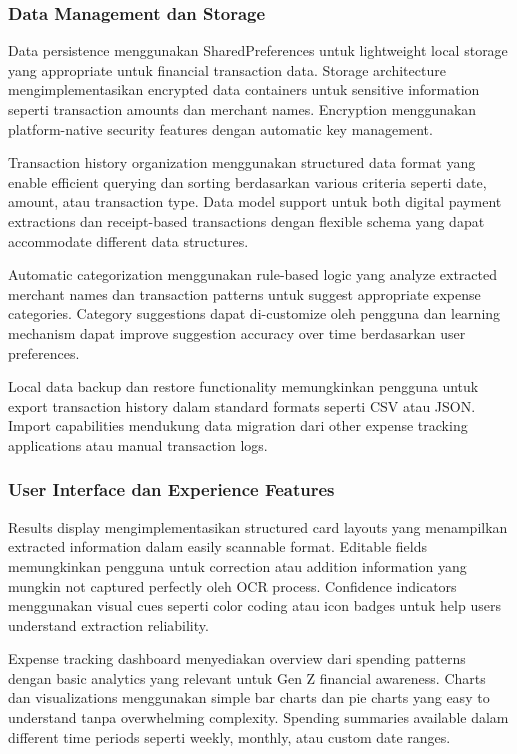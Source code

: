\subsubsection{Data Management dan Storage}
\label{subsubsec:data-management}

Data persistence menggunakan SharedPreferences untuk lightweight local storage yang appropriate untuk financial transaction data. Storage architecture mengimplementasikan encrypted data containers untuk sensitive information seperti transaction amounts dan merchant names. Encryption menggunakan platform-native security features dengan automatic key management.

Transaction history organization menggunakan structured data format yang enable efficient querying dan sorting berdasarkan various criteria seperti date, amount, atau transaction type. Data model support untuk both digital payment extractions dan receipt-based transactions dengan flexible schema yang dapat accommodate different data structures.

Automatic categorization menggunakan rule-based logic yang analyze extracted merchant names dan transaction patterns untuk suggest appropriate expense categories. Category suggestions dapat di-customize oleh pengguna dan learning mechanism dapat improve suggestion accuracy over time berdasarkan user preferences.

Local data backup dan restore functionality memungkinkan pengguna untuk export transaction history dalam standard formats seperti CSV atau JSON. Import capabilities mendukung data migration dari other expense tracking applications atau manual transaction logs.

\subsubsection{User Interface dan Experience Features}
\label{subsubsec:ui-ux-features}

Results display mengimplementasikan structured card layouts yang menampilkan extracted information dalam easily scannable format. Editable fields memungkinkan pengguna untuk correction atau addition information yang mungkin not captured perfectly oleh OCR process. Confidence indicators menggunakan visual cues seperti color coding atau icon badges untuk help users understand extraction reliability.

Expense tracking dashboard menyediakan overview dari spending patterns dengan basic analytics yang relevant untuk Gen Z financial awareness. Charts dan visualizations menggunakan simple bar charts dan pie charts yang easy to understand tanpa overwhelming complexity. Spending summaries available dalam different time periods seperti weekly, monthly, atau custom date ranges.

